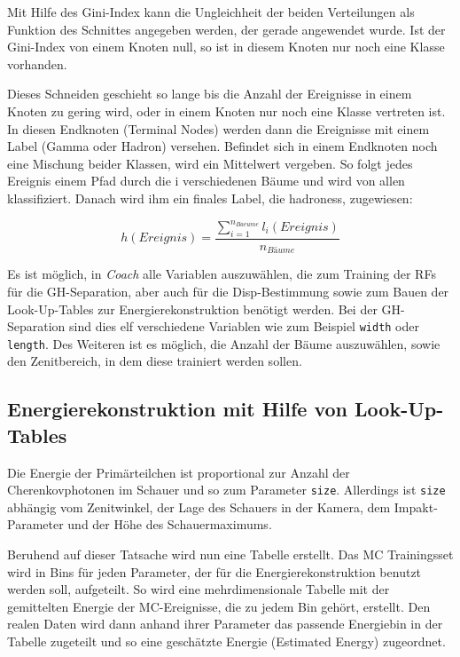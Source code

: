 Mit Hilfe des Gini-Index kann die Ungleichheit der beiden Verteilungen als Funktion des Schnittes angegeben werden, der gerade angewendet wurde.
Ist der Gini-Index von einem Knoten null, so ist in diesem Knoten nur noch eine Klasse vorhanden.

Dieses Schneiden geschieht so lange bis die Anzahl der Ereignisse in einem Knoten zu gering wird, oder in einem Knoten nur noch eine Klasse vertreten ist.
In diesen Endknoten (Terminal Nodes) werden dann die Ereignisse mit einem Label (Gamma oder Hadron) versehen. 
Befindet sich in einem Endknoten noch eine Mischung beider Klassen, wird ein Mittelwert vergeben.
So folgt jedes Ereignis einem Pfad durch die i verschiedenen Bäume und wird von allen klassifiziert.
Danach wird ihm ein finales Label, die hadroness, zugewiesen:

\begin{equation}
 h(Ereignis)=\frac{ \sum_{i=1} ^{n_{Baeume}} l_i(Ereignis)}{n_{Bäume}}
\end{equation}

Es ist möglich, in \textit{Coach} alle Variablen auszuwählen, die zum Training der RFs für die GH-Separation, aber auch für die Disp-Bestimmung sowie zum Bauen der Look-Up-Tables zur Energierekonstruktion benötigt werden.
Bei der GH-Separation sind dies elf verschiedene Variablen wie zum Beispiel \texttt{width} oder \texttt{length}.
Des Weiteren ist es möglich, die Anzahl der Bäume auszuwählen, sowie den Zenitbereich, in dem diese trainiert werden sollen.

\subsection{Energierekonstruktion mit Hilfe von Look-Up-Tables}
Die Energie der Primärteilchen ist proportional zur Anzahl der Cherenkovphotonen im Schauer und so zum Parameter \texttt{size}.
Allerdings ist \texttt{size} abhängig vom Zenitwinkel, der Lage des Schauers in der Kamera, dem Impakt-Parameter und der Höhe des Schauermaximums.

Beruhend auf dieser Tatsache wird nun eine Tabelle erstellt.
Das MC Trainingsset wird in Bins für jeden Parameter, der für die Energierekonstruktion benutzt werden soll, aufgeteilt.
So wird eine mehrdimensionale Tabelle mit der gemittelten Energie der MC-Ereignisse, die zu jedem Bin gehört, erstellt.
Den realen Daten wird dann anhand ihrer Parameter das passende Energiebin in der Tabelle zugeteilt und so eine geschätzte Energie (Estimated Energy) zugeordnet.

